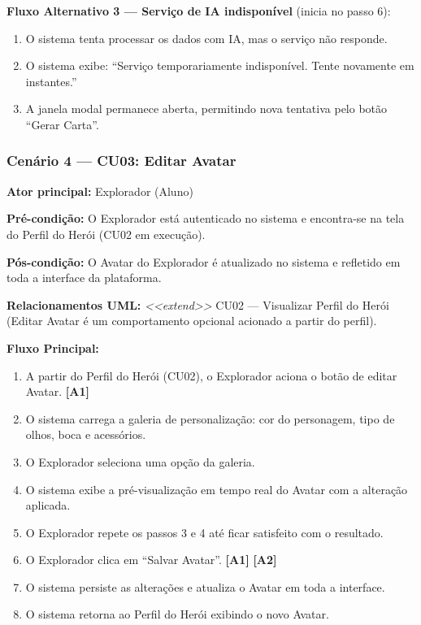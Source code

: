 \documentclass[12pt, a4paper]{article}
\begin{document}
\textbf{Fluxo Alternativo 3 --- Serviço de IA indisponível} (inicia no passo 6):
\begin{enumerate}
    \item O sistema tenta processar os dados com IA, mas o serviço não responde.
    \item O sistema exibe: ``Serviço temporariamente indisponível. Tente novamente em instantes.''
    \item A janela modal permanece aberta, permitindo nova tentativa pelo botão ``Gerar Carta''.
\end{enumerate}

\bigskip

\subsubsection*{Cenário 4 --- CU03: Editar Avatar}

\noindent\textbf{Ator principal:} Explorador (Aluno)

\noindent\textbf{Pré-condição:} O Explorador está autenticado no sistema e encontra-se
na tela do Perfil do Herói (CU02 em execução).

\noindent\textbf{Pós-condição:} O Avatar do Explorador é atualizado no sistema e refletido
em toda a interface da plataforma.

\noindent\textbf{Relacionamentos UML:} \textit{<<extend>>} CU02 --- Visualizar Perfil do
Herói (Editar Avatar é um comportamento opcional acionado a partir do perfil).

\medskip
\textbf{Fluxo Principal:}
\begin{enumerate}
    \item A partir do Perfil do Herói (CU02), o Explorador aciona o botão de editar Avatar. \textbf{[A1]}
    \item O sistema carrega a galeria de personalização: cor do personagem, tipo de olhos, boca e acessórios.
    \item O Explorador seleciona uma opção da galeria.
    \item O sistema exibe a pré-visualização em tempo real do Avatar com a alteração aplicada.
    \item O Explorador repete os passos 3 e 4 até ficar satisfeito com o resultado.
    \item O Explorador clica em ``Salvar Avatar''. \textbf{[A1]} \textbf{[A2]}
    \item O sistema persiste as alterações e atualiza o Avatar em toda a interface.
    \item O sistema retorna ao Perfil do Herói exibindo o novo Avatar.
\end{enumerate}
\end{document}
